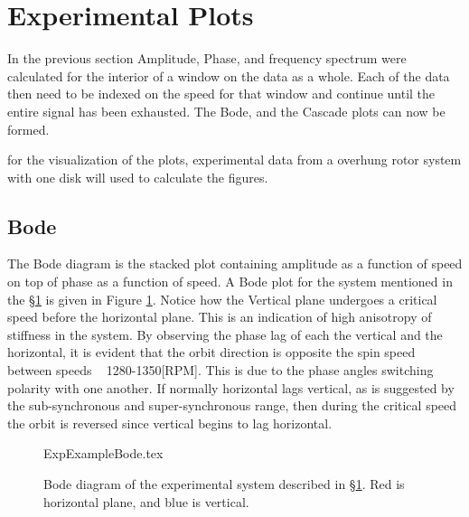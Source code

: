 \section{Experimental Plots}\label{ExperimentalPlots}
In the previous section Amplitude, Phase, and frequency spectrum were calculated for the interior of a window on the data as a whole. Each of the data then need to be indexed on the speed for that window and continue until the entire signal has been exhausted. The Bode, and the Cascade plots can now be formed.\par 
for the visualization of the plots, experimental data from a overhung rotor system with one disk will used to calculate the figures.\par
\subsection{Bode}
The Bode diagram is the stacked plot containing amplitude as a function of speed on top of phase as a function of speed. A Bode plot for the system mentioned in the \S\ref{ExperimentalPlots} is given in Figure \ref{fig:ExpExampleBode}. Notice how the Vertical plane undergoes a critical speed before the horizontal plane. This is an indication of high anisotropy of stiffness in the system. By observing the phase lag of each the vertical and the horizontal, it is evident that the orbit direction is opposite the spin speed between speeds ~ 1280-1350[RPM]. This is due to the phase angles switching polarity with one another. If normally horizontal lags vertical, as is suggested by the sub-synchronous and super-synchronous range, then during the critical speed the orbit is reversed since vertical begins to lag horizontal.
\begin{figure}
	\def\width{\linewidth/1.5}
	\def\height{\linewidth/3}
	\def\sep{3em}
	\centering
	{ExpExampleBode.tex}
	\caption{Bode diagram of the experimental system described in \S\ref{ExperimentalPlots}. Red is horizontal plane, and blue is vertical.}
	\label{fig:ExpExampleBode}
\end{figure}
